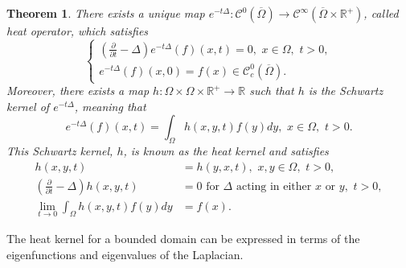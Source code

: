 \documentclass{amsart}
\newtheorem{theorem}{Theorem}[section]
\theoremstyle{definition}
\newcommand*{\R}{\mathbb{R}}
\begin{document}
\begin{theorem}
    There exists a unique map 
$e^{-t\Delta} : \mathscr{C}^0(\overline{\Omega}) \to \mathscr{C}^\infty(\overline{\Omega} \times \R^+)$, called \textit{heat operator}, which satisfies  
\begin{equation*} 
        \begin{cases}
            \left(\frac{\partial }{\partial t} - \Delta\right)e^{-t\Delta}(f)(x,t) = 0, \,\, x \in \Omega, \,\, t > 0, \\
            e^{-t\Delta}(f)(x,0) = f(x) \in \mathscr{C}_c^0(\overline{\Omega}).
        \end{cases}
\end{equation*}
Moreover, there exists a map $h : \Omega \times \Omega \times \R^+ \to \R$ such that $h$ is the Schwartz kernel of $e^{-t\Delta}$, meaning that
\begin{equation*}
    e^{-t\Delta}(f)(x,t) = \int_\Omega h(x,y,t)f(y) dy, \,\, x \in \Omega, \,\, t > 0.
\end{equation*}
This Schwartz kernel, $h$, is known as the \em heat kernel \em and satisfies 
    \begin{align}
        h(x,y,t) &= h(y,x,t), \,\, x,y \in \Omega, \,\, t > 0, \label{eq:heat_symm} \\
        \left(\frac{\partial}{\partial t} - \Delta\right)h(x,y,t) &= 0 \text{ for } \Delta \text{ acting in either } x \text{ or } y, \,\, t > 0, \label{eq:heat_eq_ker} \\
         \lim_{t \to 0} \int_\Omega h(x,y,t) f(y) dy &= f(x). \label{eq:heat_ker_ic} 
    \end{align}
\end{theorem}


The heat kernel for a bounded domain can be expressed in terms of the eigenfunctions and eigenvalues of the Laplacian.     
\end{document}
